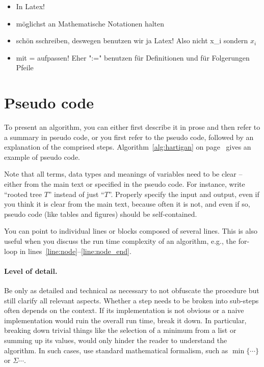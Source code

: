 \documentclass[main.tex]{subfiles}
\begin{document}

\begin{tipp}[title=Tipps]
\begin{itemize}
    \item In Latex!
    \item möglichst an Mathematische Notationen halten
    \item schön sschreiben, deswegen benutzen wir ja Latex! Also nicht x\_i sondern $x_i$
    \item mit = aufpassen! Eher ":=" benutzen für Definitionen und für Folgerungen Pfeile 
\end{itemize}
\end{tipp}
\section{Pseudo code}

To present an algorithm, you can either first describe it in prose and then refer to a summary in pseudo code, or you first refer to the pseudo code, followed by an explanation of the comprised steps. 
Algorithm~\ref{alg:hartigan} on page~\pageref{alg:hartigan} gives an example of pseudo code. 

Note that all terms, data types and meanings of variables need to be clear -- either from the main text or specified in the pseudo code. For instance, write ``rooted tree $T$'' instead of just ``$T$''. Properly specify the input and output, even if you think it is clear from the main text, because often it is not, and even if so, pseudo code (like tables and figures) should be self-contained.

You can point to individual lines or blocks composed of several lines. This is also useful when you discuss the run time complexity of an algorithm, e.g., the for-loop in lines~\ref{line:node}--\ref{line:node_end}.


\paragraph{Level of detail.} Be only as detailed and technical as necessary to not obfuscate the procedure but still clarify all relevant aspects. 
Whether a step needs to be broken into sub-steps often depends on the context. If  its implementation is not obvious or a naive implementation would ruin the overall run time, break it down. In particular, breaking down trivial things like the selection of a minimum from a list or summing up its values, would only hinder the reader to understand the algorithm. In such cases, use standard mathematical formalism, such as $\min\{\cdots\}$ or $\Sigma\cdots$. 
\end{document}
